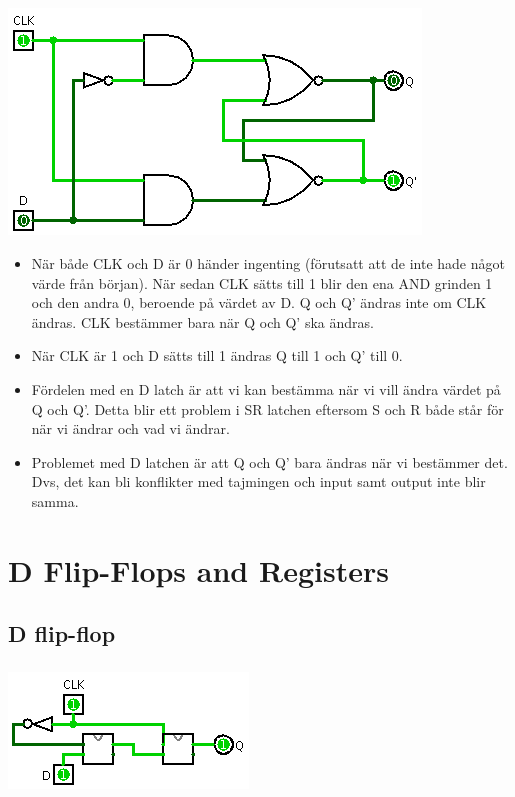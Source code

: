 \documentclass[11pt]{article}
\begin{document}
\subsection{}
\label{sec:orgheadline11}
\includegraphics[width=.9\linewidth]{./assignment4-2.png}
\begin{itemize}
\item När både CLK och D är 0 händer ingenting (förutsatt att de inte hade något värde från början). När sedan CLK sätts till 1 blir den ena AND grinden 1 och den andra 0, beroende på värdet av D. Q och Q' ändras inte om CLK ändras. CLK bestämmer bara när Q och Q' ska ändras.
\item När CLK är 1 och D sätts till 1 ändras Q till 1 och Q' till 0.
\item Fördelen med en D latch är att vi kan bestämma när vi vill ändra värdet på Q och Q'. Detta blir ett problem i SR latchen eftersom S och R både står för när vi ändrar och vad vi ändrar.
\item Problemet med D latchen är att Q och Q' bara ändras när vi bestämmer det. Dvs, det kan bli konflikter med tajmingen och input samt output inte blir samma.
\end{itemize}


\section{D Flip-Flops and Registers}
\label{sec:orgheadline17}

\subsection{D flip-flop}
\label{sec:orgheadline15}
\subsubsection{}
\label{sec:orgheadline13}
\includegraphics[width=.9\linewidth]{./assignment5-1.png}
\end{document}
